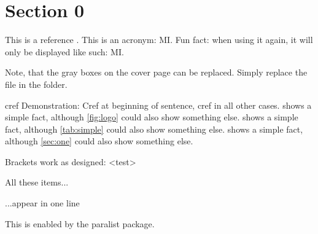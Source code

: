 \section{Section 0}\label{sec:zero}

This is a reference \cite{tur38}. This is an acronym: \ac{MI}. Fun fact: when using it again, it will only be displayed like such: \ac{MI}.

Note, that the gray boxes on the cover page can be replaced. Simply replace the  file in the  folder.

cref Demonstration: Cref at beginning of sentence, cref in all other cases.  shows a simple fact, although \cref{fig:logo} could also show something else.  shows a simple fact, although \cref{tab:simple} could also show something else.  shows a simple fact, although \cref{sec:one} could also show something else.


Brackets work as designed: <test>

\begin{inparaenum}
\item All these items...
\item ...appear in one line
\item This is enabled by the paralist package.
\end{inparaenum}


